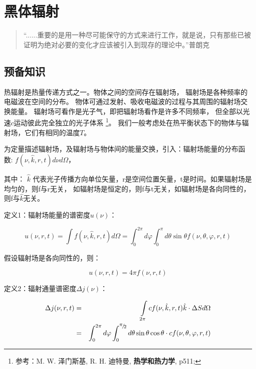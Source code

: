 \section{黑体辐射}

\begin{quotation}
``......重要的是用一种尽可能保守的方式来进行工作，就是说，只有那些已被证明为绝对必要的变化才应该被引入到现存的理论中。''\qquad 普朗克
\end{quotation}

\subsection{预备知识}


热辐射是热量传递方式之一。物体之间的空间存在辐射场，
辐射场是各种频率的电磁波在空间的分布。
物体可通过发射、吸收电磁波的过程与其周围的辐射场交换能量。
辐射场可看作是光子气，即把辐射场看作是许多不同频率，
但全部以光速$c$运动彼此完全独立的光子体系 \footnote{参考：M. W.
泽门斯基, R. H. 迪特曼, {\bf 热学和热力学}, p511;}。
我们一般考虑处在热平衡状态下的物体与辐射场，它们有相同的温度$T$。

为定量描述辐射场，及辐射场与物体间的能量交换，引入：辐射场能量的分布函数:
$f(\nu ,\hat k,r,t)d\nu d\Omega$，

其中： $\hat k$
代表光子传播方向单位矢量，r是空间位置矢量，t是时间。如果辐射场是均匀的，则f与r无关，
如辐射场是恒定的，则f与t无关，如辐射场是各向同性的，则f与$\hat k$无关。

定义1：辐射场能量的谱密度$u(\nu )$：

\begin{equation*}
u(\nu ,r,t) = \int {f(\nu ,\hat k,r,t)d\Omega }  = \int_0^{2\pi }
{d\varphi \int_0^\pi  {d\theta \sin \theta f(\nu ,\theta ,\varphi
,r,t)} }
\end{equation*}

假设辐射场是各向同性的，则：

\begin{equation}
u(\nu ,r,t) = 4\pi f(\nu ,r,t)
\end{equation}

定义2：辐射通量谱密度$\Delta j(\nu )$：

\begin{eqnarray*}
\Delta j(\nu ,r,t) & =  & \int\limits_{2\pi } {cf(\nu ,\hat k,r,t)\hat k
\cdot \Delta S d\Omega }  \\
{} & = & \int_0^{2\pi } {d\varphi
\int_0^{{\raise0.5ex\hbox{$\scriptstyle \pi $}
\kern-0.1em/\kern-0.15em \lower0.25ex\hbox{$\scriptstyle 2$}}}
{d\theta \sin \theta \cos \theta  \cdot cf(\nu ,\theta ,\varphi
,r,t)} }
\end{eqnarray*}


